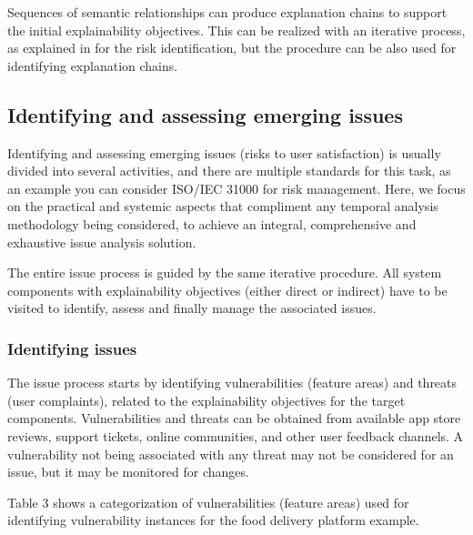 \documentclass[preprint,10pt]{elsarticle}
\begin{document}
Sequences of semantic relationships can produce explanation chains to support the initial explainability objectives. This can be realized with an iterative process, as explained in  for the risk identification, but the procedure can be also used for identifying explanation chains.

\subsection{Identifying and assessing emerging issues}

Identifying and assessing emerging issues (risks to user satisfaction) is usually divided into several activities, and there are multiple standards for this task, as an example you can consider ISO/IEC 31000 for risk management. Here, we focus on the practical and systemic aspects that compliment any temporal analysis methodology being considered, to achieve an integral, comprehensive and exhaustive issue analysis solution.

The entire issue process is guided by the same iterative procedure. All system components with explainability objectives (either direct or indirect) have to be visited to identify, assess and finally manage the associated issues.

\subsubsection{Identifying issues}

The issue process starts by identifying vulnerabilities (feature areas) and threats (user complaints), related to the explainability objectives for the target components. Vulnerabilities and threats can be obtained from available app store reviews, support tickets, online communities, and other user feedback channels. A vulnerability not being associated with any threat may not be considered for an issue, but it may be monitored for changes.

Table 3 shows a categorization of vulnerabilities (feature areas) used for identifying vulnerability instances for the food delivery platform example.
\end{document}
